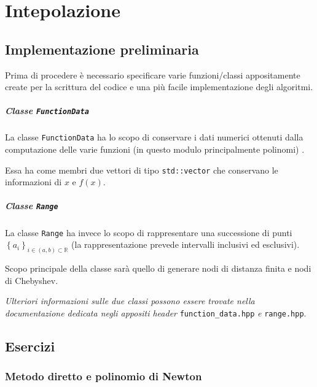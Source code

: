 \setchapterpreamble[u]{\margintoc}
\chapter{Intepolazione}


\section{Implementazione preliminaria}

Prima di procedere è necessario specificare varie funzioni/classi appositamente create
per la scrittura del codice e una più facile implementazione degli algoritmi.

\paragraph{Classe \texttt{FunctionData}}

La classe \texttt{FunctionData} ha lo scopo di conservare i dati numerici ottenuti
dalla computazione delle varie funzioni (in questo modulo principalmente polinomi) .

Essa ha come membri due vettori di tipo \texttt{std::vector} che conservano le
informazioni di $x$ e $f(x)$.

\paragraph{Classe \texttt{Range}}

La classe \texttt{Range} ha invece lo scopo di rappresentare una successione di
punti $\left\{a_i\right\}_{i \in (a, b) \subset \mathbb{R}}$ (la rappresentazione
prevede intervalli inclusivi ed esclusivi).

Scopo principale della classe sarà quello di generare nodi di distanza finita e
nodi di Chebyshev.

\textit{Ulteriori informazioni sulle due classi possono essere trovate nella
	documentazione dedicata negli appositi header} \texttt{function\_data.hpp} \textit{e}
\texttt{range.hpp}.

\section{Esercizi}

\subsection{Metodo diretto e polinomio di Newton}


